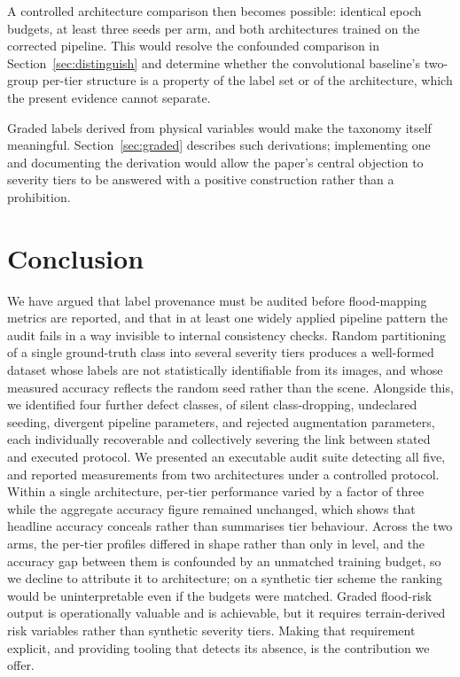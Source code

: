 A controlled architecture comparison then becomes possible: identical epoch
budgets, at least three seeds per arm, and both architectures trained on the
corrected pipeline. This would resolve the confounded comparison in
Section~\ref{sec:distinguish} and determine whether the convolutional baseline's
two-group per-tier structure is a property of the label set or of the
architecture, which the present evidence cannot separate.

Graded labels derived from physical variables would make the taxonomy itself
meaningful. Section~\ref{sec:graded} describes such derivations; implementing one
and documenting the derivation would allow the paper's central objection to
severity tiers to be answered with a positive construction rather than a
prohibition.

\section{Conclusion}

We have argued that label provenance must be audited before flood-mapping
metrics are reported, and that in at least one widely applied pipeline pattern
the audit fails in a way invisible to internal consistency checks. Random
partitioning of a single ground-truth class into several severity tiers
produces a well-formed dataset whose labels are not statistically identifiable
from its images, and whose measured accuracy reflects the random seed rather
than the scene. Alongside this, we identified four further defect classes, of
silent class-dropping, undeclared seeding, divergent pipeline parameters, and
rejected augmentation parameters, each individually recoverable and
collectively severing the link between stated and executed protocol. We
presented an executable audit suite detecting all five, and reported
measurements from two architectures under a controlled protocol. Within a
single architecture, per-tier performance varied by a factor of three while the
aggregate accuracy figure remained unchanged, which shows that headline
accuracy conceals rather than summarises tier behaviour. Across the two arms,
the per-tier profiles differed in shape rather than only in level, and the
accuracy gap between them is confounded by an unmatched training budget, so we
decline to attribute it to architecture; on a synthetic tier scheme the ranking
would be uninterpretable even if the budgets were matched. Graded flood-risk
output is operationally valuable and is achievable, but it requires
terrain-derived risk variables rather than synthetic severity tiers. Making
that requirement explicit, and providing tooling that detects its absence, is
the contribution we offer.

